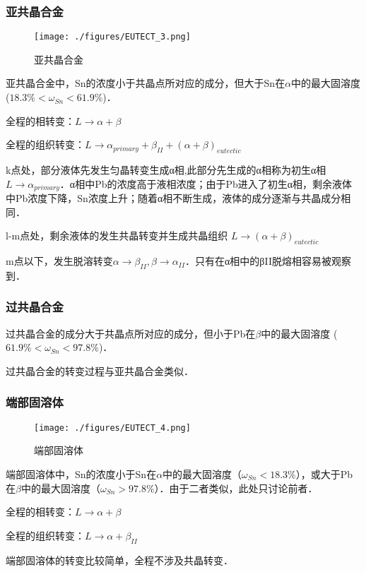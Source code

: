 \subsubsection{亚共晶合金}
\begin{figure}[ht]
\centering
\texttt{[image: ./figures/EUTECT\_3.png]}
\caption{亚共晶合金} \label{EUTECT_fig3}
\end{figure}

亚共晶合金中，Sn的浓度小于共晶点所对应的成分，但大于Sn在$\alpha$中的最大固溶度 ($18.3\%<\omega_{Sn}<61.9\%$)．

全程的相转变：$L \rightarrow \alpha+\beta$

全程的组织转变：$L \rightarrow \alpha_{primary}+\beta_{II}+(\alpha+\beta)_{eutectic}$

k点处，部分液体先发生匀晶转变生成α相,此部分先生成的α相称为初生α相$L \rightarrow \alpha_{primary}$．α相中Pb的浓度高于液相浓度；由于Pb进入了初生α相，剩余液体中Pb浓度下降，Sn浓度上升；随着α相不断生成，液体的成分逐渐与共晶成分相同．

l-m点处，剩余液体的发生共晶转变并生成共晶组织 $L \rightarrow (\alpha+\beta)_{eutectic}$

m点以下，发生脱溶转变$\alpha \rightarrow \beta_{II}, \beta \rightarrow \alpha_{II}$．只有在α相中的βII脱熔相容易被观察到．

\subsubsection{过共晶合金}
过共晶合金的成分大于共晶点所对应的成分，但小于Pb在$\beta$中的最大固溶度 ($61.9\%<\omega_{Sn}<97.8\%$)．

过共晶合金的转变过程与亚共晶合金类似．

\subsubsection{端部固溶体}
\begin{figure}[ht]
\centering
\texttt{[image: ./figures/EUTECT\_4.png]}
\caption{端部固溶体} \label{EUTECT_fig4}
\end{figure}
端部固溶体中，Sn的浓度小于Sn在$\alpha$中的最大固溶度（$\omega_{Sn}<18.3\%$），或大于Pb在$\beta$中的最大固溶度（$\omega_{Sn}>97.8\%$）．由于二者类似，此处只讨论前者．

全程的相转变：$L \rightarrow \alpha+\beta$

全程的组织转变：$L \rightarrow \alpha+ \beta_{II}$

端部固溶体的转变比较简单，全程不涉及共晶转变．

